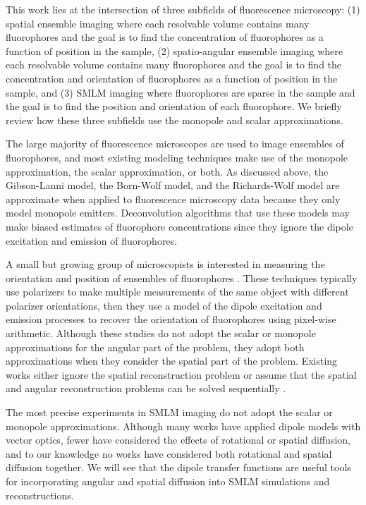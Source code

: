 \documentclass[]{osa-article}
\begin{document}
This work lies at the intersection of three subfields of fluorescence
microscopy: (1) spatial ensemble imaging where each resolvable volume contains
many fluorophores and the goal is to find the concentration of fluorophores as a
function of position in the sample, (2) spatio-angular ensemble imaging where
each resolvable volume contains many fluorophores and the goal is to find the
concentration and orientation of fluorophores as a function of position in the
sample, and (3) SMLM imaging where fluorophores are sparse in the sample and the
goal is to find the position and orientation of each fluorophore. We briefly
review how these three subfields use the monopole and scalar approximations.

The large majority of fluorescence microscopes are used to image ensembles of
fluorophores, and most existing modeling techniques make use of the monopole
approximation, the scalar approximation, or both. As discussed above, the
Gibson-Lanni model, the Born-Wolf model, and the Richards-Wolf model are
approximate when applied to fluorescence microscopy data because they only model
monopole emitters. Deconvolution algorithms that use these models may make
biased estimates of fluorophore concentrations since they ignore the dipole
excitation and emission of fluorophores. 

A small but growing group of microscopists is interested in measuring the
orientation and position of ensembles of fluorophores \cite{vrabioiu2006,
  mattheyses2010, mehta2016, mcquilken2017, zhanghao2017}. These techniques
typically use polarizers to make multiple measurements of the same object with
different polarizer orientations, then they use a model of the dipole excitation
and emission processes \cite{fourkas2001} to recover the orientation of
fluorophores using pixel-wise arithmetic. Although these studies do not adopt
the scalar or monopole approximations for the angular part of the problem, they
adopt both approximations when they consider the spatial part of the problem.
Existing works either ignore the spatial reconstruction problem
\cite{vrabioiu2006, mattheyses2010, mehta2016, mcquilken2017} or assume that the
spatial and angular reconstruction problems can be solved sequentially
\cite{zhanghao2017}.

The most precise experiments in SMLM imaging do not adopt the scalar or monopole
approximations. Although many works have applied dipole models with vector
optics, fewer have considered the effects of rotational or spatial diffusion,
and to our knowledge no works have considered both rotational and spatial
diffusion together. We will see that the dipole transfer functions are useful
tools for incorporating angular and spatial diffusion into SMLM simulations and
reconstructions.
\end{document}
